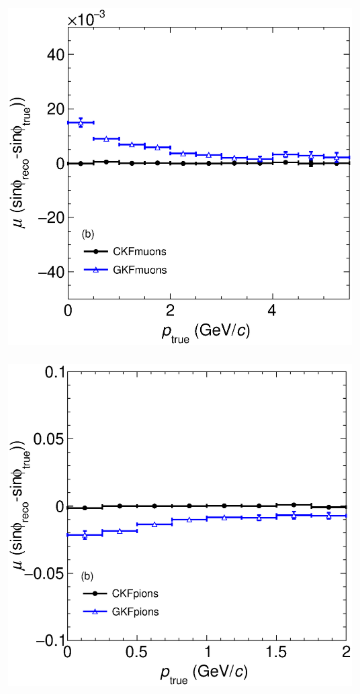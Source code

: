 \begin{figure}[t]
\begin{subfigure}{0.32\textwidth}
         \caption{}
         \label{fig:sinphiResVSp2212_Int}
     \end{subfigure}
          \begin{subfigure}{0.32\textwidth}
         \centering
         \includegraphics[width=\textwidth]{figures/ch5-KF_NDGAr/FullSample/Int/Angle_Res/sinphi/BiassinphiVSp_13.eps}
         \caption{}
         \label{fig:sinphiBiasVSp13_Int}
     \end{subfigure}
     \begin{subfigure}{0.32\textwidth}
         \centering
         \includegraphics[width=\textwidth]{figures/ch5-KF_NDGAr/FullSample/Int/Angle_Res/sinphi/BiassinphiVSp_211.eps}

\end{subfigure}
\end{figure}
